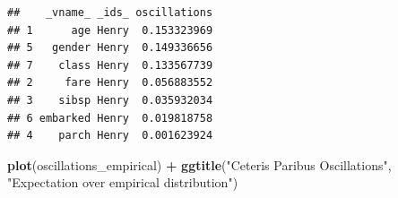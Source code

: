 \documentclass[]{krantz}
\newenvironment{Shaded}{\begin{snugshade}}{\end{snugshade}}
\newcommand{\DataTypeTok}[1]{\textcolor[rgb]{0.13,0.29,0.53}{#1}}
\newcommand{\KeywordTok}[1]{\textcolor[rgb]{0.13,0.29,0.53}{\textbf{#1}}}
\newcommand{\NormalTok}[1]{#1}
\newcommand{\OperatorTok}[1]{\textcolor[rgb]{0.81,0.36,0.00}{\textbf{#1}}}
\newcommand{\StringTok}[1]{\textcolor[rgb]{0.31,0.60,0.02}{#1}}
\begin{document}
\begin{Shaded}
\end{Shaded}

\begin{Shaded}
\end{Shaded}

\begin{verbatim}
##    _vname_ _ids_ oscillations
## 1      age Henry  0.153323969
## 5   gender Henry  0.149336656
## 7    class Henry  0.133567739
## 2     fare Henry  0.056883552
## 3    sibsp Henry  0.035932034
## 6 embarked Henry  0.019818758
## 4    parch Henry  0.001623924
\end{verbatim}

\begin{Shaded}
\begin{Highlighting}[]
\KeywordTok{plot}\NormalTok{(oscillations_empirical) }\OperatorTok{+}\StringTok{ }
\StringTok{    }\KeywordTok{ggtitle}\NormalTok{(}\StringTok{"Ceteris Paribus Oscillations"}\NormalTok{, }
              \StringTok{"Expectation over empirical distribution"}\NormalTok{)}
\end{Highlighting}
\end{Shaded}
\end{document}
